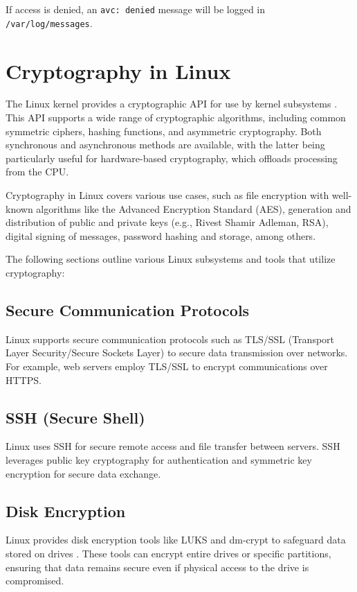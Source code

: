 \documentclass[conference]{IEEEtran}
\begin{document}
If access is denied, an \texttt{avc: denied} message will be logged in \texttt{/var/log/messages}.

\section{Cryptography in Linux}
The Linux kernel provides a cryptographic API for use by kernel subsystems \cite{sandilands}. This API supports a wide range of cryptographic algorithms, including common symmetric ciphers, hashing functions, and asymmetric cryptography. Both synchronous and asynchronous methods are available, with the latter being particularly useful for hardware-based cryptography, which offloads processing from the CPU.

Cryptography in Linux covers various use cases, such as file encryption with well-known algorithms like the Advanced Encryption Standard (AES), generation and distribution of public and private keys (e.g., Rivest Shamir Adleman, RSA), digital signing of messages, password hashing and storage, among others.

The following sections outline various Linux subsystems and tools that utilize cryptography:

\subsection{Secure Communication Protocols}
Linux supports secure communication protocols such as TLS/SSL (Transport Layer Security/Secure Sockets Layer) to secure data transmission over networks. For example, web servers employ TLS/SSL to encrypt communications over HTTPS.

\subsection{SSH (Secure Shell)}
Linux uses SSH for secure remote access and file transfer between servers. SSH leverages public key cryptography for authentication and symmetric key encryption for secure data exchange.

\subsection{Disk Encryption}
Linux provides disk encryption tools like LUKS and dm-crypt to safeguard data stored on drives \cite{liquid-web}. These tools can encrypt entire drives or specific partitions, ensuring that data remains secure even if physical access to the drive is compromised.
\end{document}

